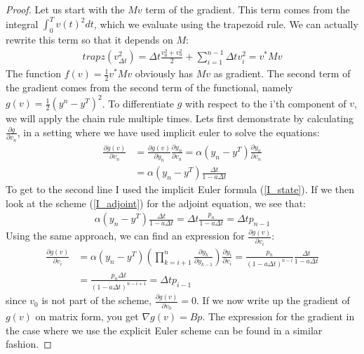 \begin{proof}
Let us start with the $Mv$ term of the gradient. This term comes from the integral $\int_0^T v(t)^2dt$, which we evaluate using the trapezoid rule. We can actually rewrite this term so that it depends on $M$:
\begin{align*}
trapz(v_{\Delta t}^2)=  \Delta t\frac{v_0^2+v_n^2}{2} + \sum_{i=1}^{n-1} \Delta t v_i^2 = v^*Mv
\end{align*} 
The function $f(v)=\frac{1}{2} v^*Mv$ obviously has $Mv$ as gradient. The second term of the gradient comes from the second term of the functional, namely $g(v)=\frac{1}{2}(y^n -y^T)^2$. To differentiate $g$ with respect to the i'th component of $v$, we will apply the chain rule multiple times. Lets first demonstrate by calculating $\frac{\partial g}{\partial v_n}$, in a setting where we have used implicit euler to solve the equations:
\begin{align*}
\frac{\partial g(v)}{\partial v_n} &= \frac{\partial g(v)}{\partial y_n}\frac{\partial y_n}{\partial v_n} = \alpha(y_n -y^T)\frac{\partial y_n}{\partial v_n}\\
&= \alpha(y_n -y^T)\frac{\Delta t}{1-a\Delta t}
\end{align*}
To get to the second line I used the implicit Euler formula (\ref{I_state}). If we then look at the scheme (\ref{I_adjoint}) for the adjoint equation, we see that:
\begin{align*}
\alpha(y_n -y^T)\frac{\Delta t}{1-a\Delta t} = \Delta t\frac{p_n}{1-a\Delta t} = \Delta t p_{n-1}
\end{align*} 
Using the same approach, we can find an expression for $\frac{\partial g(v)}{\partial v_i}$: 
\begin{align*}
\frac{\partial g(v)}{\partial v_i} &= \alpha(y_n -y^T) (\prod_{k=i+1}^{n}\frac{\partial y_{k}}{\partial y_{k-1}}) \frac{\partial y_i}{\partial v_{i}} = \frac{p_n}{(1-a\Delta t)^{n-i}}\frac{\Delta t}{1-a\Delta t} \\
&= \frac{p_n\Delta t}{(1-a\Delta t)^{n-i+1}}=\Delta t p_{i-1}
\end{align*}
since $v_0$ is not part of the scheme, $\frac{\partial g(v)}{\partial v_0}=0$. If we now write up the gradient of $g(v)$ on matrix form, you get $\nabla g(v) = Bp$. The expression for the gradient in the case where we use the explicit Euler scheme can be found in a similar fashion. 
\end{proof}

